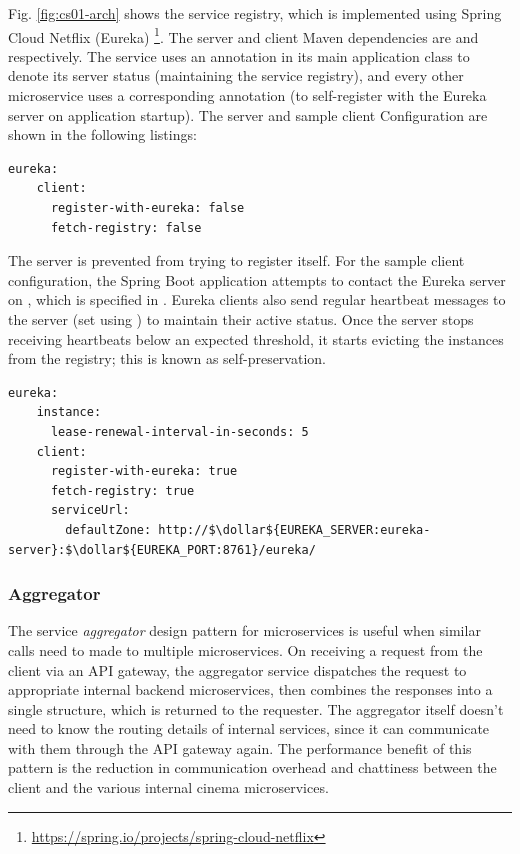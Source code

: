Fig. \ref{fig:cs01-arch} shows the service registry, which is implemented using Spring Cloud Netflix (Eureka) \footnote{\url{https://spring.io/projects/spring-cloud-netflix}}. The server and client Maven dependencies are  and  respectively. The  service uses an  annotation in its main application class to denote its server status (maintaining the service registry), and every other microservice uses a corresponding  annotation (to self-register with the Eureka server on application startup). The server and sample client Configuration are shown in the following listings:

\begin{lstlisting}[caption=Snippet from Eureka server's application properties]
  eureka:
    client:
      register-with-eureka: false
      fetch-registry: false
\end{lstlisting}

The server is prevented from trying to register itself. For the sample client configuration, the Spring Boot application attempts to contact the Eureka server on , which is specified in . Eureka clients also send regular heartbeat messages to the server (set using ) to maintain their active status. Once the server stops receiving heartbeats below an expected threshold, it starts evicting the instances from the registry; this is known as self-preservation. 

\begin{lstlisting}[caption=Snippet from a Eureka client's application properties]
  eureka:
    instance:
      lease-renewal-interval-in-seconds: 5
    client:
      register-with-eureka: true
      fetch-registry: true
      serviceUrl:
        defaultZone: http://$\dollar${EUREKA_SERVER:eureka-server}:$\dollar${EUREKA_PORT:8761}/eureka/
\end{lstlisting}

\subsubsection{Aggregator}

The service \textit{aggregator} design pattern for microservices is useful when similar calls need to made to multiple microservices. On receiving a request from the client via an API gateway, the aggregator service dispatches the request to appropriate internal backend microservices, then combines the responses into a single structure, which is returned to the requester. The aggregator itself doesn't need to know the routing details of internal services, since it can communicate with them through the API gateway again. The performance benefit of this pattern is the reduction in communication overhead and chattiness between the client and the various internal cinema microservices. 

